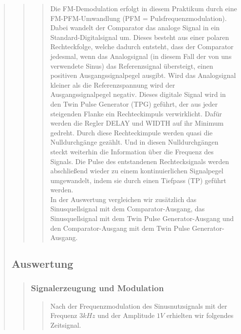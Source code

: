 \begin{quote}
\begin{quote}
\begin{quote}
        Die FM-Demodulation erfolgt in diesem Praktikum durch eine FM-PFM-Umwandlung (PFM = Pulsfrequenzmodulation).
        Dabei wandelt der Comparator das analoge Signal in ein Standard-Digitalsignal um. Dieses besteht aus einer
        polaren Rechteckfolge, welche dadurch entsteht, dass der Comparator jedesmal, wenn das Analogsignal (in diesem
        Fall der von uns verwendete Sinus) das Referenzsignal übersteigt, einen positiven Ausgangssignalpegel ausgibt.
        Wird das Analogsignal kleiner als die Referenzspannung wird der Ausgangssignalpegel negativ. Dieses digitale
        Signal wird in den Twin Pulse Generator (TPG) geführt, der aus jeder steigenden Flanke ein Rechteckimpuls
        verwirklicht. Dafür werden die Regler DELAY und WIDTH auf ihr Minimum gedreht. Durch diese Rechteckimpule werden
        quasi die Nulldurchgänge gezählt. Und in diesen Nulldurchgängen steckt weiterhin die Information über die
        Frequenz des Signals. Die Pulse des entstandenen Rechtecksignals werden abschließend wieder zu einem
        kontinuierlichen Signalpegel umgewandelt, indem sie durch einen Tiefpass (TP) geführt werden.\\
        
        In der Auswertung vergleichen wir zusätzlich das Sinusquellsignal mit dem Comparator-Ausgang, das
        Sinusquellsignal mit dem Twin Pulse Generator-Ausgang und den Comparator-Ausgang mit dem Twin Pulse
        Generator-Ausgang.
         
        \end{quote}
        
    \end{quote}
    
    \subsection{Auswertung}
    \begin{quote}
    	
    	\subsubsection{Signalerzeugung und Modulation}
    	\begin{quote}
    	
        Nach der Frequenzmodulation des Sinusnutzsignals mit der Frequenz 
        $3 kHz$ und der Amplitude $1 V$ erhielten wir folgendes Zeitsignal.
    	
             \begin{figure}[H] \centering
                   

\end{figure}
\end{quote}
\end{quote}
\end{quote}

